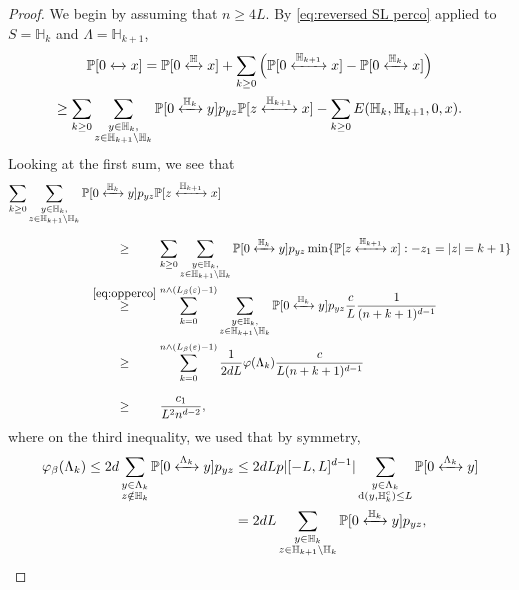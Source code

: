 \documentclass[11pt,a4paper]{article}
\numberwithin{equation}{section}
\theoremstyle{plain}
\theoremstyle{definition}
\newcommand{\connect}{\xleftrightarrow}
\begin{document}
\begin{proof}
We begin by assuming that $n\geq 4L$. By \eqref{eq:reversed SL perco} applied to $S=\mathbb H_k$ and $\Lambda=\mathbb H_{k+1}$,
\begin{multline}\label{eq: lower bound typical full space perco}
\mathbb P[0\connect{}x]=\mathbb P[0\connect{\mathbb H\:}x]+\sum_{k\geq 0}\Big(\mathbb P[0\connect{\mathbb H_{k+1}\:}x]-\mathbb P[0\connect{\mathbb H_k\:}x]\Big)
\\\ge \sum_{k\ge 0}\sum_{\substack{y\in \mathbb H_k,\\ z\in \mathbb H_{k+1}\setminus\mathbb H_k}}\mathbb P[0\connect{\mathbb H_k\:}y]p_{yz} \mathbb P[z\connect{\mathbb H_{k+1}\:}x]-\sum_{k\geq 0}E(\mathbb H_k,\mathbb H_{k+1},0,x).
\end{multline}
Looking at the first sum, we see that
\begin{align}
 	\sum_{k\ge 0}\sum_{\substack{y\in \mathbb H_k,\\ z\in \mathbb H_{k+1}\setminus\mathbb H_k}}\mathbb P&[0\connect{\mathbb H_k\:}y]p_{yz} \mathbb P[z\connect{\mathbb H_{k+1}\:}x]\notag
 	\\&\stackrel{\phantom{\eqref{eq:opperco}}}\geq \sum_{k\ge 0}\sum_{\substack{y\in \mathbb H_k,\\ z\in \mathbb H_{k+1}\setminus\mathbb H_k}}\mathbb P[0\connect{\mathbb H_k\:}y]p_{yz}\min\{\mathbb P[z\connect{\mathbb H_{k+1}\:}x]:-z_1=|z|=k+1\}\notag
 	\\&\stackrel{\eqref{eq:opperco}}\geq \sum_{k=0}^{n\wedge (L_\beta(\varepsilon)-1)}\sum_{\substack{y\in \mathbb H_k,\\ z\in \mathbb H_{k+1}\setminus\mathbb H_k}}\mathbb P[0\connect{\mathbb H_k\:}y]p_{yz}\frac{c}{L}\frac{1}{(n+k+1)^{d-1}}\notag
 	\\&\stackrel{\phantom{\eqref{eq:opperco}}}\geq \sum_{k=0}^{n\wedge (L_\beta(\varepsilon)-1)}\frac1{2dL}\varphi(\Lambda_k)\frac{c}{L(n+k+1)^{d-1}}\notag
 	\\&\stackrel{\phantom{\eqref{eq:opperco}}}\geq \frac{c_1}{L^2n^{d-2}},\label{eq: lower bound full space good perco}
\end{align}
where on the third inequality, we used that by symmetry,\begin{align}\notag
	\varphi_\beta(\Lambda_k)\leq 2d\sum_{\substack{y\in \Lambda_k\\z\notin \mathbb H_k}}\mathbb P[0\connect{\Lambda_k\:}y]p_{yz}&\leq 2dL p|[-L,L]^{d-1}|\sum_{\substack{y\in \Lambda_k\\\mathrm{d}(y,\mathbb H_k^c)\leq L}}\mathbb P[0\connect{\Lambda_k\:}y]\\&=2dL \sum_{\substack{y \in \mathbb H_k\\z\in \mathbb H_{k+1}\setminus \mathbb H_k}}\mathbb P[0\connect{\mathbb H_k\:}y]p_{yz},

\end{align}
\end{proof}
\end{document}
